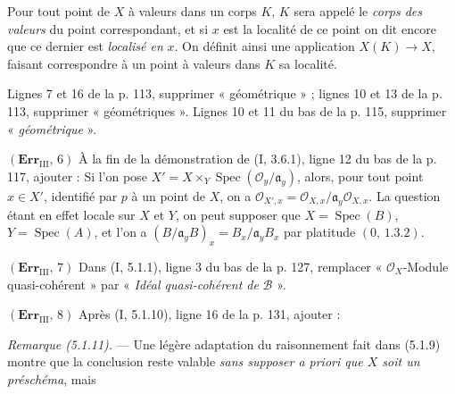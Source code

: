 Pour tout point de $X$ à valeurs dans un corps $K$, $K$ sera appelé le
\emph{corps des valeurs} du point correspondant, et si $x$ est la localité de
ce point on dit encore que ce dernier est \emph{localisé en} $x$. On définit
ainsi une application $X(K)\to X$, faisant correspondre à un point à valeurs
dans $K$ sa localité.

Lignes 7 et 16 de la p. 113, supprimer « géométrique » ; lignes 10 et 13 de
la p. 113, supprimer « géométriques ». Lignes 10 et 11 du bas de la p. 115,
supprimer « \emph{géométrique} ».

\noindent\textbf{$(\mathbf{Err}_{\mathrm{III}},\,6)$} À la fin de la
démonstration de (I, 3.6.1), ligne 12 du bas de la p. 117, ajouter : Si l'on
pose
$X'=X\times_Y\operatorname{Spec}(\mathscr O_y/\mathfrak a_y)$, alors, pour tout
point $x\in X'$, identifié par $p$ à un point de $X$, on a
$\mathscr O_{X',x}=\mathscr O_{X,x}/\mathfrak a_y\mathscr O_{X,x}$. La question
étant en effet locale sur $X$ et $Y$, on peut supposer que
$X=\operatorname{Spec}(B)$, $Y=\operatorname{Spec}(A)$, et l'on a
$(B/\mathfrak a_yB)_x=B_x/\mathfrak a_yB_x$ par platitude $(0,\,1.3.2)$.

\noindent\textbf{$(\mathbf{Err}_{\mathrm{III}},\,7)$} Dans (I, 5.1.1), ligne 3
du bas de la p. 127, remplacer « $\mathscr O_X$-Module quasi-cohérent » par
« \emph{Idéal quasi-cohérent de} $\mathscr B$ ».

\noindent\textbf{$(\mathbf{Err}_{\mathrm{III}},\,8)$} Après (I, 5.1.10),
ligne 16 de la p. 131, ajouter :

\emph{Remarque (5.1.11).} --- Une légère adaptation du raisonnement fait dans
(5.1.9) montre que la conclusion reste valable \emph{sans supposer a priori
que $X$ soit un préschéma}, mais

